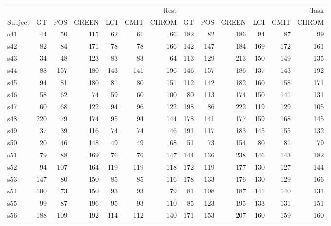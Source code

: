 \begin{tabular}{lrrrrrrrrrrrr}
\toprule
 & \multicolumn{6}{r}{Rest} & \multicolumn{6}{r}{Task} \\
Subject & GT & POS & GREEN & LGI & OMIT & CHROM & GT & POS & GREEN & LGI & OMIT & CHROM \\
\midrule
s41 & 44 & 50 & 115 & 62 & 61 & 66 & 182 & 82 & 186 & 94 & 87 & 99 \\
s42 & 82 & 84 & 171 & 78 & 78 & 166 & 142 & 147 & 184 & 169 & 172 & 161 \\
s43 & 34 & 48 & 123 & 83 & 83 & 64 & 113 & 129 & 213 & 150 & 149 & 135 \\
s44 & 88 & 157 & 180 & 143 & 141 & 196 & 146 & 157 & 186 & 137 & 143 & 192 \\
s45 & 94 & 81 & 180 & 81 & 80 & 151 & 112 & 142 & 182 & 160 & 158 & 171 \\
s46 & 58 & 62 & 74 & 59 & 60 & 100 & 80 & 113 & 174 & 150 & 141 & 131 \\
s47 & 60 & 68 & 122 & 94 & 96 & 122 & 198 & 86 & 222 & 119 & 129 & 105 \\
s48 & 220 & 79 & 174 & 95 & 94 & 144 & 178 & 141 & 177 & 159 & 168 & 145 \\
s49 & 37 & 39 & 116 & 74 & 74 & 46 & 191 & 117 & 183 & 145 & 155 & 132 \\
s50 & 20 & 46 & 148 & 49 & 49 & 68 & 51 & 73 & 154 & 80 & 81 & 79 \\
s51 & 79 & 88 & 169 & 76 & 76 & 147 & 144 & 136 & 238 & 146 & 143 & 182 \\
s52 & 94 & 107 & 164 & 119 & 119 & 118 & 172 & 119 & 177 & 130 & 127 & 144 \\
s53 & 147 & 80 & 150 & 85 & 85 & 116 & 178 & 133 & 176 & 130 & 129 & 166 \\
s54 & 100 & 73 & 150 & 93 & 93 & 79 & 81 & 108 & 187 & 141 & 140 & 131 \\
s55 & 99 & 87 & 196 & 95 & 93 & 110 & 85 & 123 & 195 & 133 & 131 & 151 \\
s56 & 188 & 109 & 192 & 114 & 112 & 140 & 171 & 153 & 207 & 160 & 159 & 160 \\
\bottomrule
\end{tabular}
